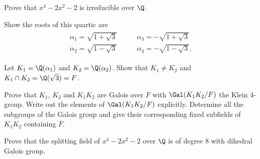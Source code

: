 \documentclass[10pt]{amsart}
\begin{document}
\begin{thm}
  \label{Ex5}
  \begin{alphaenum}
    \item
      Prove that $x^4 - 2x^2 - 2$ is irreducible over $\Q$.
    \item
      Show the roots of this quartic are 
      \begin{align*}
        \begin{split}
          \alpha_1 = \sqrt{1 + \sqrt{3}} \qquad & \alpha_3 = -\sqrt{1 + \sqrt{3}}\\
          \alpha_2 = \sqrt{1 - \sqrt{3}} \qquad & \alpha_4 = -\sqrt{1 - \sqrt{3}}.
        \end{split}
      \end{align*}
    \item
      Let $K_1 = \Q(\alpha_1)$ and $K_2 = \Q(\alpha_2)$.  Show that $K_1 \neq K_2$ and $K_1 \cap K_2 = \Q(\sqrt{3}) = F$.
    \item
      Prove that $K_1$, $K_2$ and $K_1K_2$ are Galois over $F$ with $\Gal(K_1K_2/F)$ the Klein 4-group.
      Write out the elements of $\Gal(K_1K_2/F)$ explicitly.
      Determine all the subgroups of the Galois group and give their corresponding fixed subfields of $K_1K_2$ containing $F$.
    \item
      Prove that the splitting field of $x^4 - 2x^2 -2 $ over $\Q$ is of degree 8 with dihedral Galois group.
  \end{alphaenum}


\end{thm}
\end{document}
